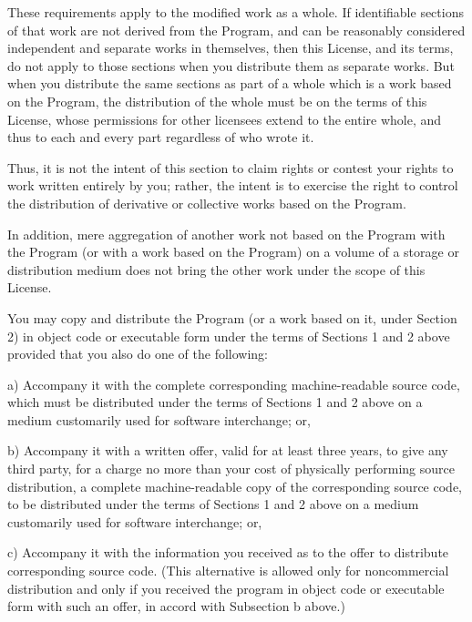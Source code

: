 These requirements apply to the modified work as a whole. If identifiable sections of that work are not derived from the Program, and can be reasonably considered independent and separate works in themselves, then this License, and its terms, do not apply to those sections when you distribute them as separate works. But when you distribute the same sections as part of a whole which is a work based on the Program, the distribution of the whole must be on the terms of this License, whose permissions for other licensees extend to the entire whole, and thus to each and every part regardless of who wrote it.

Thus, it is not the intent of this section to claim rights or contest your rights to work written entirely by you; rather, the intent is to exercise the right to control the distribution of derivative or collective works based on the Program.

In addition, mere aggregation of another work not based on the Program with the Program (or with a work based on the Program) on a volume of a storage or distribution medium does not bring the other work under the scope of this License.


\begin{DoxyEnumerate}
\item You may copy and distribute the Program (or a work based on it, under Section 2) in object code or executable form under the terms of Sections 1 and 2 above provided that you also do one of the following\+: \begin{DoxyVerb}a) Accompany it with the complete corresponding machine-readable
source code, which must be distributed under the terms of Sections
1 and 2 above on a medium customarily used for software interchange; or,

b) Accompany it with a written offer, valid for at least three
years, to give any third party, for a charge no more than your
cost of physically performing source distribution, a complete
machine-readable copy of the corresponding source code, to be
distributed under the terms of Sections 1 and 2 above on a medium
customarily used for software interchange; or,

c) Accompany it with the information you received as to the offer
to distribute corresponding source code.  (This alternative is
allowed only for noncommercial distribution and only if you
received the program in object code or executable form with such
an offer, in accord with Subsection b above.)
\end{DoxyVerb}

\end{DoxyEnumerate}

